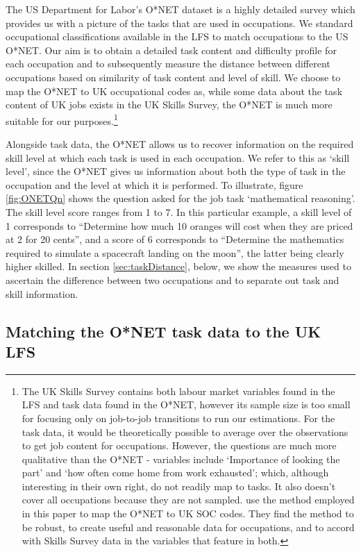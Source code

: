 \documentclass[11pt, oneside]{article}
\begin{document}
	The US Department for Labor's O*NET dataset is a highly detailed survey which provides us with a picture of the tasks that are used in occupations. We standard occupational classifications available in the LFS to match occupations to the US O*NET. Our aim is to obtain a detailed task content and difficulty profile for each occupation and to subsequently measure the distance between different occupations based on similarity of task content and level of skill. We choose to map the O*NET to UK occupational codes as, while some data about the task content of UK jobs exists in the UK Skills Survey, the O*NET is much more suitable for our purposes.\footnote{The UK Skills Survey contains both labour market variables found in the LFS and task data found in the O*NET, however its sample size is too small for focusing only on job-to-job transitions to run our estimations. For the task data, it would be theoretically possible to average over the observations to get job content for occupations. However, the questions are much more qualitative than the O*NET - variables include `Importance of looking the part' and `how often come home from work exhausted'; which, although interesting in their own right, do not readily map to tasks. It also doesn't cover all occupations because they are not sampled. \cite{ONETreport} use the method employed in this paper to map the O*NET to UK SOC codes. They find the method to be robust, to create useful and reasonable data for occupations, and to accord with Skills Survey data in the variables that feature in both.} 
	
	Alongside task data, the O*NET allows us to recover information on the required skill level at which each task is used in each occupation. We refer to this as `skill level', since the O*NET gives us information about both the type of task in the occupation and the level at which it is performed. To illustrate, figure \ref{fig:ONETQn} shows the question asked for the job task `mathematical reasoning'. The skill level score ranges from 1 to 7. In this particular example, a skill level of 1 corresponds to ``Determine how much 10 oranges will cost when they are priced at 2 for 20 cents'', and a score of 6 corresponds to ``Determine the mathematics required to simulate a spacecraft landing on the moon'', the latter being clearly higher skilled. In section \ref{sec:taskDistance}, below, we show the measures used to ascertain the difference between two occupations and to separate out task and skill information. 
	
	\subsection{Matching the O*NET task data to the UK LFS}
\label{sec:matchLFSONET}
\end{document}
